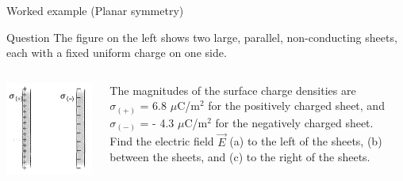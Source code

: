 {
\problemslide

%
%

\begin{frame}{Worked example (Planar symmetry)}

  \begin{blockexmplque}{Question}
    The figure on the left shows two large, parallel, non-conducting sheets,
    each with a fixed uniform charge on one side.\\
    \begin{columns}
      \begin{column}{0.20\textwidth}
        \begin{center}
          \includegraphics[width=0.99\textwidth]{./images/problems/lect02_2_charged_planes.png}\\
        \end{center}
      \end{column}
      \begin{column}{0.80\textwidth}
        The magnitudes of the surface charge densities are\\
        $\sigma_{(+)}$ = 6.8 $\mu$C/m$^2$ for the positively charged sheet, and
        $\sigma_{(-)}$ = - 4.3 $\mu$C/m$^2$ for the negatively charged sheet.\\
        Find the electric field $\vec{E}$
        (a) to the left of the sheets,
        (b) between the sheets, and
        (c) to the right of the sheets.
     \end{column}
   \end{columns}
  \end{blockexmplque}
  \vspace{0.4cm}


\end{frame}}
